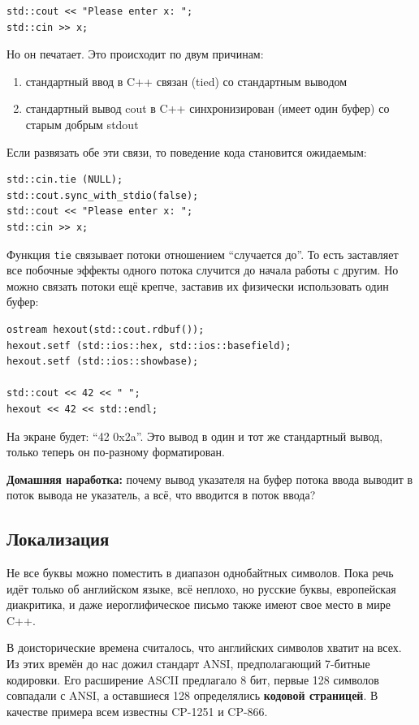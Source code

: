 \documentclass[a4paper,12pt,oneside]{article}
\begin{document}
\begin{lstlisting}
std::cout << "Please enter x: ";
std::cin >> x;
\end{lstlisting}

Но он печатает. Это происходит по двум причинам:

\begin{enumerate}
\item стандартный ввод в C++ связан (tied) со стандартным выводом
\item стандартный вывод cout в C++ синхронизирован (имеет один буфер) со старым добрым stdout
\end{enumerate}

Если развязать обе эти связи, то поведение кода становится ожидаемым:

\begin{lstlisting}
std::cin.tie (NULL);
std::cout.sync_with_stdio(false);
std::cout << "Please enter x: ";
std::cin >> x;
\end{lstlisting}

Функция \lstinline!tie! связывает потоки отношением ``случается до''. То есть заставляет все побочные эффекты одного потока случится до начала работы с другим. Но можно связать потоки ещё крепче, заставив их физически использовать один буфер:

\begin{lstlisting}
ostream hexout(std::cout.rdbuf());
hexout.setf (std::ios::hex, std::ios::basefield);
hexout.setf (std::ios::showbase);

std::cout << 42 << " ";
hexout << 42 << std::endl;
\end{lstlisting}

На экране будет: ``42 0x2a''. Это вывод в один и тот же стандартный вывод, только теперь он по-разному форматирован.

\textbf{Домашняя наработка:} почему вывод указателя на буфер потока ввода выводит в поток вывода не указатель, а всё, что вводится в поток ввода?

\pagebreak
\subsection{Локализация}\label{Localization}

Не все буквы можно поместить в диапазон однобайтных символов. Пока речь идёт только об английском языке, всё неплохо, но русские буквы, европейская диакритика, и даже иероглифическое письмо также имеют свое место в мире C++.

В доисторические времена считалось, что английских символов хватит на всех. Из этих времён до нас дожил стандарт ANSI, предполагающий 7-битные кодировки. Его расширение ASCII предлагало 8 бит, первые 128 символов совпадали с ANSI, а оставшиеся 128 определялись \textbf{кодовой страницей}. В качестве примера всем известны CP-1251 и CP-866.
\end{document}
